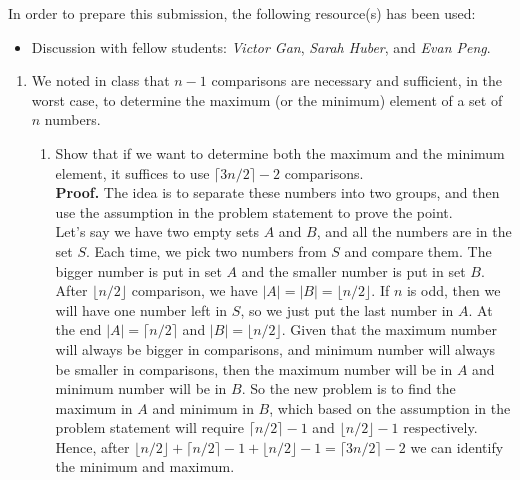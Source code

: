 \documentclass[letterpaper,12pt]{article}
\begin{document}
\pagestyle{fancy}

In order to prepare this submission, the following resource(s) has been used:
\begin{itemize}
	\item Discussion with fellow students: \textit{Victor Gan}, \textit{Sarah Huber}, and \textit{Evan Peng}.
\end{itemize}

\begin{enumerate}
	\item We noted in class that $n-1$ comparisons are necessary and sufficient, in the worst case, to determine the maximum (or the minimum) element of a set of $n$ numbers.
	\begin{enumerate}
		\item Show that if we want to determine both the maximum and the minimum element, it suffices to use $\lceil 3n/2\rceil - 2$ comparisons.\\
		\textbf{Proof.} The idea is to separate these numbers into two groups, and then use the assumption in the problem statement to prove the point.\\ Let's say we have two empty sets $A$ and $B$, and all the numbers are in the set $S$. Each time, we pick two numbers from $S$ and compare them. The bigger number is put in set $A$ and the smaller number is put in set $B$. After $\lfloor n/2 \rfloor$ comparison, we have $|A|=|B|=\lfloor n/2 \rfloor$. If $n$ is odd, then we will have one number left in $S$, so we just put the last number in $A$. At the end $|A|=\lceil n/2 \rceil$ and $|B|=\lfloor n/2 \rfloor$. Given that the maximum number will always be bigger in comparisons, and minimum number will always be smaller in comparisons, then the maximum number will be in $A$ and minimum number will be in $B$. So the new problem is to find the maximum in $A$ and minimum in $B$, which based on the assumption in the problem statement will require $\lceil n/2 \rceil -1$ and $\lfloor n/2 \rfloor-1$ respectively. Hence, after $\lfloor n/2 \rfloor + \lceil n/2 \rceil -1 + \lfloor n/2 \rfloor-1 = \lceil 3n/2\rceil - 2$ we can identify the minimum and maximum.
	

\end{enumerate}
\end{enumerate}
\end{document}
